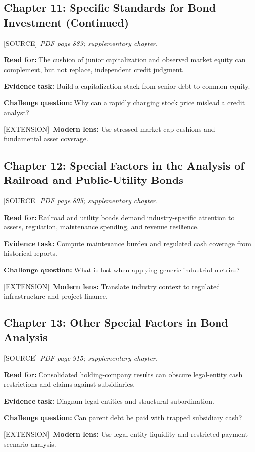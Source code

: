 \documentclass[11pt,letterpaper]{article}
\newcommand{\src}{\textsf{\color{sea}[SOURCE]}}
\newcommand{\ext}{\textsf{\color{gold}[EXTENSION]}}
\begin{document}
\subsection{Chapter 11: Specific Standards for Bond Investment (Continued)}
\src\ \textit{PDF page 883; supplementary chapter.}\par
\textbf{Read for:} The cushion of junior capitalization and observed market equity can complement, but not replace, independent credit judgment.\par
\textbf{Evidence task:} Build a capitalization stack from senior debt to common equity.\par
\textbf{Challenge question:} Why can a rapidly changing stock price mislead a credit analyst?\par
\ext\ \textbf{Modern lens:} Use stressed market-cap cushions and fundamental asset coverage.\par

\subsection{Chapter 12: Special Factors in the Analysis of Railroad and Public-Utility Bonds}
\src\ \textit{PDF page 895; supplementary chapter.}\par
\textbf{Read for:} Railroad and utility bonds demand industry-specific attention to assets, regulation, maintenance spending, and revenue resilience.\par
\textbf{Evidence task:} Compute maintenance burden and regulated cash coverage from historical reports.\par
\textbf{Challenge question:} What is lost when applying generic industrial metrics?\par
\ext\ \textbf{Modern lens:} Translate industry context to regulated infrastructure and project finance.\par

\subsection{Chapter 13: Other Special Factors in Bond Analysis}
\src\ \textit{PDF page 915; supplementary chapter.}\par
\textbf{Read for:} Consolidated holding-company results can obscure legal-entity cash restrictions and claims against subsidiaries.\par
\textbf{Evidence task:} Diagram legal entities and structural subordination.\par
\textbf{Challenge question:} Can parent debt be paid with trapped subsidiary cash?\par
\ext\ \textbf{Modern lens:} Use legal-entity liquidity and restricted-payment scenario analysis.\par
\end{document}
